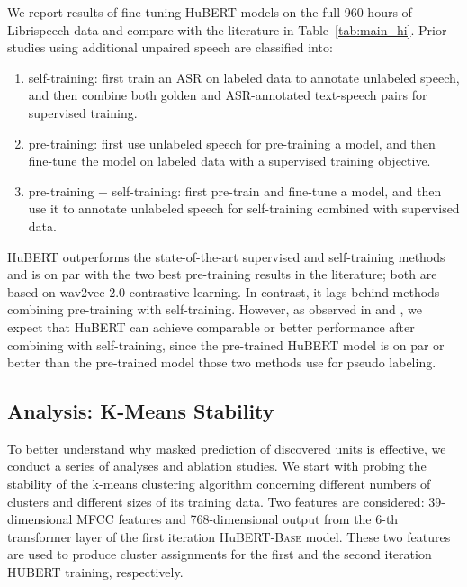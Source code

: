 We report results of fine-tuning HuBERT models on the full 960 hours of Librispeech data and compare with the literature in Table~\ref{tab:main_hi}. Prior studies using additional unpaired speech are classified into:
\begin{enumerate}
    \item self-training: first train an ASR on labeled data to annotate unlabeled speech, and then combine both golden and ASR-annotated text-speech pairs for supervised training.
    \item pre-training: first use unlabeled speech for pre-training a model, and then fine-tune the model on labeled data with a supervised training objective.
    \item pre-training + self-training: first pre-train and fine-tune a model, and then use it to annotate unlabeled speech for self-training combined with supervised data.
\end{enumerate}
HuBERT outperforms the state-of-the-art supervised and self-training methods and is on par with the two best pre-training results in the literature; both are based on wav2vec 2.0 contrastive learning.
In contrast, it lags behind methods combining pre-training with self-training. However, as observed in \cite{xu2020self} and \cite{zhang2020pushing}, we expect that HuBERT can achieve comparable or better performance after combining with self-training, since the pre-trained HuBERT model is on par or better than the pre-trained model those two methods use for pseudo labeling.


\subsection{Analysis: K-Means Stability}
To better understand why masked prediction of discovered units is effective, we conduct a series of analyses and ablation studies. We start with probing the stability of the k-means clustering algorithm concerning different numbers of clusters and different sizes of its training data.
Two features are considered: 39-dimensional MFCC features and 768-dimensional output from the 6-th transformer layer of the first iteration HuBERT-\textsc{Base} model. These two features are used to produce cluster assignments for the first and the second iteration HUBERT training, respectively.

